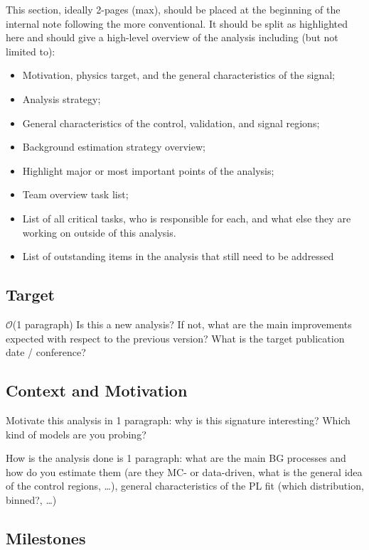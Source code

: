 This section, ideally 2-pages (max), should be placed at the beginning of the internal 
note following the more conventional.  It should be split as highlighted here and should 
give a high-level overview of the analysis including (but not limited to):
\begin{itemize}
\item Motivation, physics target, and the general characteristics of the signal;
\item Analysis strategy;
\item General characteristics of the control, validation, and signal regions;
\item Background estimation strategy overview;
\item Highlight major or most important points of the analysis;
\item Team overview task list;
\item List of all critical tasks, who is responsible for each, and what else they are working on outside of this analysis.
\item List of outstanding items in the analysis that still need to be addressed
\end{itemize}

\subsection{Target} 

\(\mathcal{O}\)(1 paragraph)
Is this a new analysis? If not, what are the main improvements expected with respect to the previous version?
What is the target publication date / conference?

\subsection{Context and Motivation} 

Motivate this analysis in 1 paragraph: why is this signature interesting? Which kind of models are you probing?

How is the analysis done is 1 paragraph: what are the main BG processes and how do you estimate them (are they MC- or data-driven,
what is the general idea of the control regions, \ldots), general characteristics of the PL fit (which distribution, binned?, \ldots)

\subsection{Milestones}

